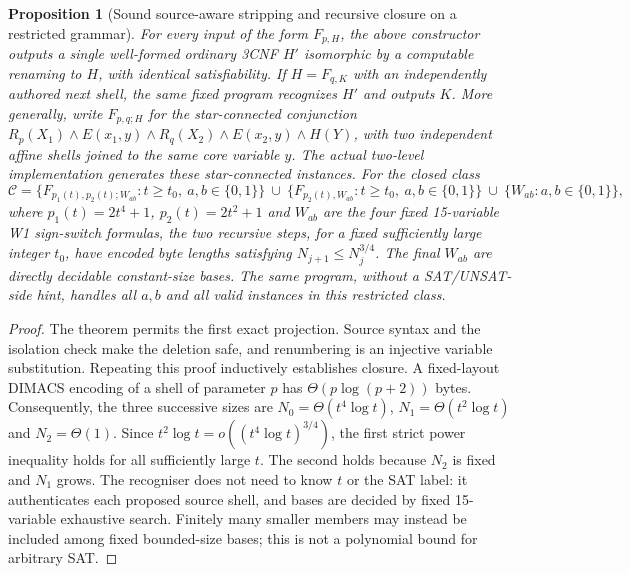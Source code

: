 \documentclass[11pt]{article}
\newtheorem{proposition}[theorem]{Proposition}
\begin{document}
\begin{proposition}[Sound source-aware stripping and recursive closure on a restricted grammar]
For every input of the form $F_{p,H}$, the above constructor outputs a single well-formed ordinary 3CNF $H'$ isomorphic by a computable renaming to $H$, with identical satisfiability. If $H=F_{q,K}$ with an independently authored next shell, the same fixed program recognizes $H'$ and outputs $K$. More generally, write $F_{p,q;H}$ for the \emph{star-connected} conjunction $R_p(X_1)\land E(x_1,y)\land R_q(X_2)\land E(x_2,y)\land H(Y)$, with two independent affine shells joined to the same core variable $y$. The actual two-level implementation generates these star-connected instances. For the closed class
\[
\mathcal C=\{F_{p_1(t),p_2(t);W_{ab}}:t\ge t_0,\ a,b\in\{0,1\}\}
\ \cup\ \{F_{p_2(t),W_{ab}}:t\ge t_0,\ a,b\in\{0,1\}\}
\ \cup\ \{W_{ab}:a,b\in\{0,1\}\},
\]
where $p_1(t)=2t^4+1$, $p_2(t)=2t^2+1$ and $W_{ab}$ are the four fixed 15-variable W1 sign-switch formulas, the two recursive steps, for a fixed sufficiently large integer $t_0$, have encoded byte lengths satisfying $N_{j+1}\le N_j^{3/4}$. The final $W_{ab}$ are directly decidable constant-size bases. The same program, without a SAT/UNSAT-side hint, handles all $a,b$ and all valid instances in this restricted class.
\end{proposition}
\begin{proof}
The theorem permits the first exact projection. Source syntax and the isolation check make the deletion safe, and renumbering is an injective variable substitution. Repeating this proof inductively establishes closure. A fixed-layout DIMACS encoding of a shell of parameter $p$ has $\Theta(p\log(p+2))$ bytes. Consequently, the three successive sizes are $N_0=\Theta(t^4\log t)$, $N_1=\Theta(t^2\log t)$ and $N_2=\Theta(1)$. Since $t^2\log t=o((t^4\log t)^{3/4})$, the first strict power inequality holds for all sufficiently large $t$. The second holds because $N_2$ is fixed and $N_1$ grows. The recogniser does not need to know $t$ or the SAT label: it authenticates each proposed source shell, and bases are decided by fixed 15-variable exhaustive search. Finitely many smaller members may instead be included among fixed bounded-size bases; this is not a polynomial bound for arbitrary SAT.
\end{proof}
\end{document}
